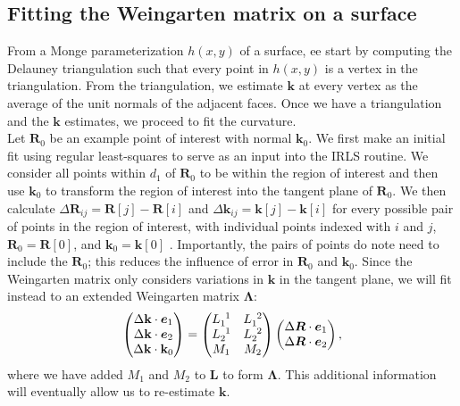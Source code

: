\subsection{Fitting the Weingarten matrix on a surface}
From a Monge parameterization $h(x,y)$ of a surface, ee start by computing the Delauney triangulation such that every point in $h(x,y)$ is a vertex in the triangulation.
From the triangulation, we estimate $\mathbf{k}$ at every vertex as the average of the unit normals of the adjacent faces.
Once we have a triangulation and the $\mathbf{k}$ estimates, we proceed to fit the curvature.\\

Let $\mathbf{R}_0$ be an example point of interest with normal $\mathbf{k}_0$.
We first make an initial fit using regular least-squares to serve as an input into the IRLS routine.
We consider all points within $d_1$ of $\mathbf{R}_0$ to be within the region of interest and then use $\mathbf{k}_0$ to transform the region of interest into the tangent plane of $\mathbf{R}_0$.
We then calculate $\Delta \mathbf{R}_{ij} = \mathbf{R}[j]-\mathbf{R}[i]$ and $\Delta \mathbf{k}_{ij} = \mathbf{k}[j]-\mathbf{k}[i]$ for every possible pair of points in the region of interest, with individual points indexed with $i$ and $j$, $\mathbf{R}_0 = \mathbf{R}[0]$, and $\mathbf{k}_0 = \mathbf{k}[0]$ .
Importantly, the pairs of points do note need to include the $\mathbf{R}_0$; this reduces the influence of error in $\mathbf{R}_0$ and $\mathbf{k}_0$.
Since the Weingarten matrix only considers variations in $\mathbf{k}$ in the tangent plane, we will fit instead to an extended Weingarten matrix $\bm{\Lambda}$:
\begin{equation}
\begin{pmatrix}
\Delta \mathbf{k} \cdot \bm{e}_1 \\
\Delta \mathbf{k} \cdot \bm{e}_2 \\
\Delta \mathbf{k} \cdot \mathbf{k}_0
\end{pmatrix}
=
\begin{pmatrix}
\tensor{L}{_1^1} & \tensor{L}{_1^2} \\
\tensor{L}{_2^1} & \tensor{L}{_2^2} \\
M_{1} & M_{2}
\end{pmatrix}
\begin{pmatrix}
\Delta \bm{R} \cdot \bm{e}_1 \\
\Delta \bm{R} \cdot \bm{e}_2
\end{pmatrix},
\label{e:3-Kfit2}
\end{equation}
where we have added $M_1$ and $M_2$ to $\mathbf{L}$ to form $\bm{\Lambda}$.
This additional information will eventually allow us to re-estimate $\mathbf{k}$. \\

